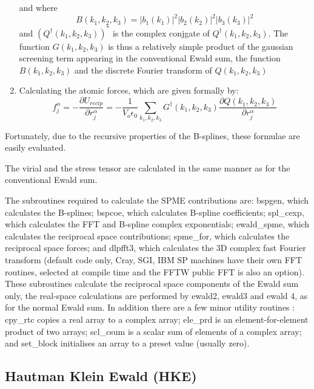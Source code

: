 \begin{enumerate}
and where
\begin{equation}
B(k_{1},k_{2},k_{3})=|b_{1}(k_{1})|^{2} |b_{2}(k_{2})|^{2}
|b_{3}(k_{3})|^{2}
\end{equation}
and $(Q^{\dagger}(k_{1},k_{2},k_{3}))^{*}$ is the complex conjgate of
$Q^{\dagger}(k_{1},k_{2},k_{3})$. The function $G(k_{1},k_{2},k_{3})$ is thus
a relatively simple product of the gaussian screening term appearing
in the conventional Ewald sum, the function $B(k_{1},k_{2},k_{3})$ and
the discrete Fourier transform of $Q(k_{1},k_{2},k_{3})$
\item Calculating the atomic forces, which are given formally by:
\begin{equation}
f_{j}^{\alpha}=-\frac{\partial U_{recip}}{\partial r_{j}^{\alpha}}
=-\frac{1}{V_{o}\epsilon_{0}}\sum_{k_{1},k_{2},k_{3}}
G^{\dagger}(k_{1},k_{2},k_{3})
\frac{\partial Q(k_{1},k_{2},k_{3})}{\partial r_{j}^{\alpha}}
\end{equation}
\end{enumerate}
Fortunately, due to the recursive properties of the B-splines, these
formulae are easily evaluated.

The virial and the stress tensor are calculated in the same manner as
for the conventional Ewald sum.

The \D{} subroutines required to calculate the SPME contributions are:\newline
{\sc bspgen}, which calculates the B-splines;
{\sc bspcoe}, which calculates B-spline coefficients;
{\sc spl\_cexp}, which calculates the FFT and B-spline complex exponentials;
{\sc ewald\_spme}, which calculates the reciprocal space contributions;
{\sc spme\_for}, which calculates the reciprocal space forces; and
{\sc dlpfft3}, which calculates the 3D complex fast Fourier transform
(default code only, Cray, SGI, IBM SP machines have their own FFT
routines, selected at compile time and the FFTW public FFT is also an option).
These subroutines calculate the reciprocal space components of the
Ewald sum only, the real-space calculations are performed by {\sc
ewald2}, {\sc ewald3} and {\sc ewald 4}, as for the normal Ewald sum.
In addition there are a few minor utility routines :
{\sc cpy\_rtc} copies a real array to a complex array;
{\sc ele\_prd} is an element-for-element product of two arrays;
{\sc scl\_csum} is a  scalar sum of elements of a complex array; and
{\sc set\_block} initialises an array to a preset value (usually zero).

\subsection{Hautman Klein Ewald (HKE)}

